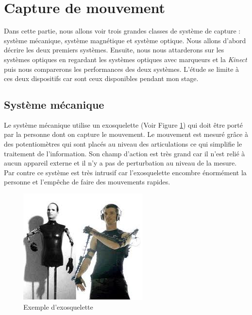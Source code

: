 \section{Capture de mouvement}
Dans cette partie, nous allons voir trois grandes classes de système de capture : système mécanique, système magnétique et système optique\cite{kn07}\cite{zo12}. Nous allons d'abord décrire les deux premiers systèmes. Ensuite, nous nous attarderons sur les systèmes optiques en regardant les systèmes optiques avec marqueurs et la \emph{Kinect} puis nous comparerons les performances des deux systèmes. L'étude se limite à ces deux dispositifs car sont ceux disponibles pendant mon stage.
\subsection{Système mécanique}
 Le système mécanique utilise un exosquelette (Voir Figure \ref{fig7}) qui doit être porté par la personne dont on capture le mouvement. Le mouvement est mesuré grâce à des potentiomètres qui sont placés au niveau des articulations ce qui simplifie le traitement de l'information. Son champ d'action est très grand car il n'est relié à aucun appareil externe et il n'y a pas de perturbation au niveau de la mesure. Par contre ce système est très intrusif car l'exosquelette encombre énormément la personne et l'empêche de faire des mouvements rapides.
 \begin{figure}[!h]
    	\centerline{\includegraphics[scale=0.8]{./captureMecaTest}}
    	\caption{\label{fig7} Exemple d'exosquelette}
 \end{figure}
